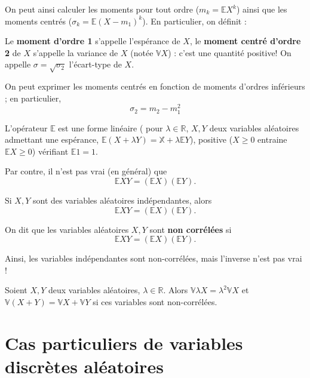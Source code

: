 \documentclass[]{book}
\theoremstyle{definition}
\theoremstyle{definition}
\theoremstyle{definition}
\theoremstyle{remark}
\let\BeginKnitrBlock\begin \let\EndKnitrBlock\end
\begin{document}
On peut ainsi calculer les moments pour tout ordre (\(m_k = \mathbb{E} X^k\)) ainsi que les moments centrés (\(\sigma_k = \mathbb{E} (X - m_1)^k\)). En particulier, on définit :
\BeginKnitrBlock{definition}
\protect\hypertarget{def:unnamed-chunk-12}{}{\label{def:unnamed-chunk-12} } Le \textbf{moment d'ordre 1} s'appelle l'espérance de \(X\), le \textbf{moment centré d'ordre 2} de \(X\) s'appelle la variance de \(X\) (notée \(\mathbb{V}X\)) : c'est une quantité positive!
On appelle \(\sigma = \sqrt{\sigma_2}\) l'écart-type de \(X\).
\EndKnitrBlock{definition}

\BeginKnitrBlock{lemma}
\protect\hypertarget{lem:unnamed-chunk-13}{}{\label{lem:unnamed-chunk-13} }On peut exprimer les moments centrés en fonction de moments d'ordres inférieurs ; en particulier,
\[\sigma_2 = m_2 - m_1^2 \]
\EndKnitrBlock{lemma}

\BeginKnitrBlock{theorem}
\protect\hypertarget{thm:unnamed-chunk-14}{}{\label{thm:unnamed-chunk-14} }L'opérateur \(\mathbb{E}\) est une forme linéaire ( pour \(\lambda \in \mathbb{R}\),
\(X,Y\) deux variables aléatoires admettant une espérance,
\(\mathbb{E} (X+\lambda Y) = \mathbb{X} + \lambda \mathbb{E} Y\)), positive (\(X \geq 0\) entraine \(\mathbb{E}X \geq 0\)) vérifiant \(\mathbb{E}1 = 1\).
\EndKnitrBlock{theorem}

Par contre, il n'est pas vrai (en général) que
\[\mathbb{E} XY = (\mathbb{E}X) ( \mathbb{E} Y) . \]

\BeginKnitrBlock{lemma}
\protect\hypertarget{lem:unnamed-chunk-15}{}{\label{lem:unnamed-chunk-15} }Si \(X,Y\) sont des variables aléatoires indépendantes, alors
\[ \mathbb{E} XY = (\mathbb{E}X) ( \mathbb{E} Y) . \]
\EndKnitrBlock{lemma}

\BeginKnitrBlock{definition}
\protect\hypertarget{def:unnamed-chunk-16}{}{\label{def:unnamed-chunk-16} }On dit que les variables aléatoires \(X,Y\) sont \textbf{non corrélées} si \[ \mathbb{E} XY = (\mathbb{E}X) ( \mathbb{E} Y) . \]
\EndKnitrBlock{definition}

Ainsi, les variables indépendantes sont non-corrélées, mais l'inverse n'est pas vrai !

\BeginKnitrBlock{theorem}
\protect\hypertarget{thm:unnamed-chunk-17}{}{\label{thm:unnamed-chunk-17} }Soient \(X,Y\) deux variables aléatoires, \(\lambda \in \mathbb{R}\). Alors \(\mathbb{V} \lambda X = \lambda^2 \mathbb{V}X\) et \(\mathbb{V}(X+Y) = \mathbb{V}X+\mathbb{V}Y\) si ces variables sont non-corrélées.
\EndKnitrBlock{theorem}

\hypertarget{cas-particuliers-de-variables-discruxe8tes-aluxe9atoires}{%
\section{Cas particuliers de variables discrètes aléatoires}\label{cas-particuliers-de-variables-discruxe8tes-aluxe9atoires}}
\end{document}
